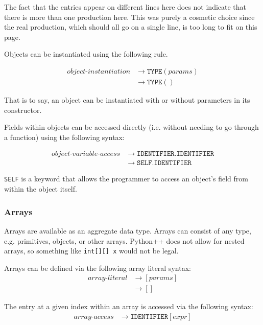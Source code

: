\documentclass{article}
\begin{document}
The fact that the entries appear on different lines here does not indicate that there is more than one production here. This was purely a cosmetic choice since the real production, which should all go on a single line, is too long to fit on this page.

Objects can be instantiated using the following rule.

\label{sec:object-instantiation}
\begin{align*}
    \textit{object-instantiation} &\to \texttt{TYPE}(\hyperref[sec:params]{\textit{params}}) \\
    &\to \texttt{TYPE}()
\end{align*}

That is to say, an object can be instantiated with or without parameters in its constructor.

Fields within objects can be accessed directly (i.e. without needing to go through a function) using the following syntax:

\label{sec:object-variable-access}
\begin{align*}
    \textit{object-variable-access} &\to \texttt{IDENTIFIER}.\texttt{IDENTIFIER} \\
    &\to \texttt{SELF}.\texttt{IDENTIFIER}
\end{align*}

\texttt{SELF} is a keyword that allows the programmer to access an object's field from within the object itself.

\subsubsection{Arrays}
Arrays are available as an aggregate data type. Arrays can consist of any type, e.g. primitives, objects, or other arrays. Python++ does not allow for nested arrays, so something like \texttt{int[][] x} would not be legal.

Arrays can be defined via the following array literal syntax:
\label{sec:array-literal}
\begin{align*}
    \textit{array-literal} &\to [\hyperref[sec:params]{\textit{params}}] \\
    &\to []
\end{align*}

The entry at a given index within an array is accessed via the following syntax:
\label{sec:array-access}
\begin{align*}
    \textit{array-access} &\to \texttt{IDENTIFIER}[\hyperref[sec:expr]{\textit{expr}}]
\end{align*}
\end{document}
